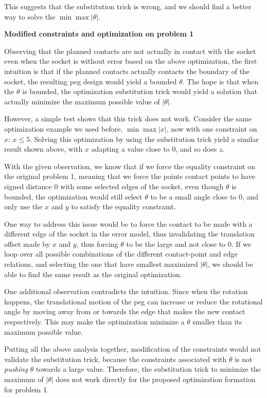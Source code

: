 \documentclass[11pt]{article}
\begin{document}
This suggests that the substitution trick is wrong, and we should find a better way to solve the $\min\max|\theta|$. 


\noindent\textbf{Modified constraints and optimization on problem 1}

Observing that the planned contacts are not actually in contact with the socket even when the socket is without error based on the above optimization, the first intuition is that if the planned contacts actually contacts the boundary of the socket, the resulting peg design would yield a bounded $\theta$. The hope is that when the $\theta$ is bounded, the optimization substitution trick would yield a solution that actually minimize the maximum possible value of $|\theta|$. 

However, a simple test shows that this trick does not work. Consider the same optimization example we used before, $\min\max |x|$, now with one constraint on $x$: $x \leq 5$. Solving this optimization by using the substitution trick yield a similar result shown above, with $x$ adapting a value close to $0$, and so does $z$. 

With the given observation, we know that if we force the equality constraint on the original problem 1, meaning that we force the points contact points to have signed distance $0$ with some selected edges of the socket, even though $\theta$ is bounded, the optimization would still select $\theta$ to be a small angle close to $0$, and only use the $x$ and $y$ to satisfy the equality constraint. 

One way to address this issue would be to force the contact to be made with a different edge of the socket in the error model, thus invalidating the translation offset made by $x$ and $y$, thus forcing $\theta$ to be the large and not close to $0$. If we loop over all possible combinations of the different contact-point and edge relations, and selecting the one that have smallest maximized $|\theta|$, we should be able to find the same result as the original optimization. 

One additional observation contradicts the intuition. Since when the rotation happens, the translational motion of the peg can increase or reduce the rotational angle by moving away from or towards the edge that makes the new contact respectively. This may make the optimization minimize a $\theta$ smaller than its maximum possible value. 

Putting all the above analysis together, modification of the constraints would not validate the substitution trick, because the constraints associated with $\theta$ is not {\em pushing} $\theta$ towards a large value. Therefore, the substitution trick to minimize the maximum of $|\theta|$ does not work directly for the proposed optimization formation for problem 1. 
\end{document}

